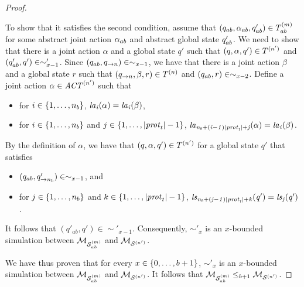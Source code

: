 \documentclass{article}
\begin{document}
\begin{proof}
\begin{itemize}
  To show that it satisfies the second condition, assume that $(q_{ab},
  \alpha_{ab}, q_{ab}') \in T^{(m)}_{ab}$ for some abstract joint action
  $\alpha_{ab}$ and abstract global state $q_{ab}'$. We need to show that there
  is a joint action $\alpha$ and a  global state $q'$ such that $(q, \alpha, q')
  \in T^{(n')}$ and $(q_{ab}', q') \in \sim'_{x-1}$. Since $(q_{ab},
  q_{\rightarrow n}) \in \sim_{x-1}$, we have that there is a joint action
  $\beta$ and a global state $r$ such that $(q_{\rightarrow n}, \beta, r) \in
  T^{(n)}$ and $(q_{ab}, r) \in \sim_{x-2}$. Define a joint action
  $\alpha \in \mathit{ACT}^{(n')}$ such that
  
  \begin{itemize}
      \item for $i \in \left \{ 1,\ldots,n_b \right \}$, $\it{la}_{i}({\alpha}) = \it{la}_{i}({\beta})$, 
      \item  for $i \in \left \{ 1, \ldots, n_b \right \}$ and $j \in \left \{ 1,\ldots,|\mathit{prot}_{t}| -  1 \right \}$, $\it{la}_{n_b + (i-1)|\mathit{prot}_{t}| + j}({\alpha}) = \it{la}_{i}({\beta})$.
  \end{itemize}

  By the definition of $\alpha$, we have that $(q, \alpha, q')  \in
  T^{(n')}$ for a global state $q'$ that satisfies

  \begin{itemize}
    \item  $(q_{ab},q'_{\rightarrow n_b}) \in \sim_{x-1}$, and 
    \item  for $j \in \left \{ 1, \ldots, n_b \right \}$ and $k \in \left \{ 1,\ldots,|\mathit{prot}_{t}| -  1 \right \}$, 
        $\it{ls}_{n_b + (j-1)|\mathit{prot}_{t}| + k}(q') = \it{ls}_{j}(q')$.
  \end{itemize}

  It follows that $(q'_{ab}, q') \in \sim'_{x-1}$. Consequently, $\sim'_{x}$
  is an $x$-bounded simulation between $\mathcal{M}_{\mathcal{S}_{ab}^{(m)}}$ and $\mathcal{M}_{\mathcal{S}^{(n')}}$.

\end{itemize}

We have thus proven that for every $x \in \left \{ 0, \ldots, b+1 \right \}$, $\sim'_x$ is an
$x$-bounded simulation between $\mathcal{M}_{\mathcal{S}_{ab}^{(m)}}$ and $\mathcal{M}_{\mathcal{S}^{(n')}}$.  It follows  that
$\mathcal{M}_{\mathcal{S}_{ab}^{(m)}} \leq_{b+1} \mathcal{M}_{\mathcal{S}^{(n')}}$.

\end{proof}
\end{document}
